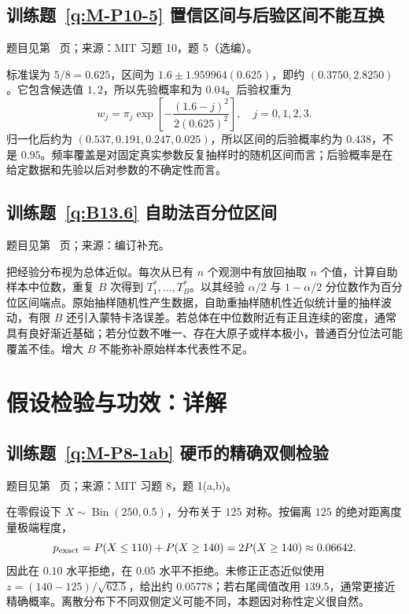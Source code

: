 \subsection*{训练题~\ref{q:M-P10-5} 置信区间与后验区间不能互换}\label{a:M-P10-5}{\small 题目见第~\pageref{q:M-P10-5} 页；来源：MIT 习题 10，题 5（选编）。}
\begin{solve}标准误为 $5/8=0.625$，区间为 $1.6\pm1.959964(0.625)$，即约 $(0.3750,2.8250)$。它包含候选值 $1,2$，所以先验概率和为 $0.04$。后验权重为\[w_j=\pi_j\exp\left[-\frac{(1.6-j)^2}{2(0.625)^2}\right],\quad j=0,1,2,3.\]归一化后约为 $(0.537,0.191,0.247,0.025)$，所以区间的后验概率约为 $0.438$，不是 $0.95$。频率覆盖是对固定真实参数反复抽样时的随机区间而言；后验概率是在给定数据和先验以后对参数的不确定性而言。\end{solve}

\subsection*{训练题~\ref{q:B13.6} 自助法百分位区间}\label{a:B13.6}{\small 题目见第~\pageref{q:B13.6} 页；来源：编订补充。}
\begin{solve}把经验分布视为总体近似。每次从已有 $n$ 个观测中有放回抽取 $n$ 个值，计算自助样本中位数，重复 $B$ 次得到 $T_1^*,\ldots,T_B^*$。以其经验 $\alpha/2$ 与 $1-\alpha/2$ 分位数作为百分位区间端点。原始抽样随机性产生数据，自助重抽样随机性近似统计量的抽样波动，有限 $B$ 还引入蒙特卡洛误差。若总体在中位数附近有正且连续的密度，通常具有良好渐近基础；若分位数不唯一、存在大原子或样本极小，普通百分位法可能覆盖不佳。增大 $B$ 不能弥补原始样本代表性不足。\end{solve}

\clearpage\section*{假设检验与功效：详解}

\subsection*{训练题~\ref{q:M-P8-1ab} 硬币的精确双侧检验}\label{a:M-P8-1ab}{\small 题目见第~\pageref{q:M-P8-1ab} 页；来源：MIT 习题 8，题 1(a,b)。}
\begin{solve}在零假设下 $X\sim\operatorname{Bin}(250,0.5)$，分布关于 $125$ 对称。按偏离 $125$ 的绝对距离度量极端程度，\[p_{\rm exact}=P(X\le110)+P(X\ge140)=2P(X\ge140)\approx0.06642.\]因此在 $0.10$ 水平拒绝，在 $0.05$ 水平不拒绝。未修正正态近似使用 $z=(140-125)/\sqrt{62.5}$，给出约 $0.05778$；若右尾阈值改用 $139.5$，通常更接近精确概率。离散分布下不同双侧定义可能不同，本题因对称性定义很自然。\end{solve}

